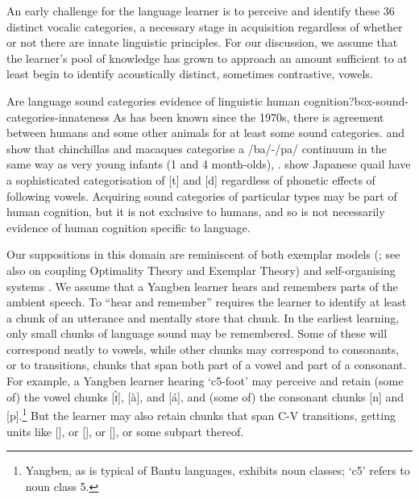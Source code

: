 An early challenge for the language learner is to perceive and identify these 36 distinct vocalic categories, a necessary  stage in acquisition regardless of whether or not there are innate linguistic principles. For our discussion, we assume that the learner's pool of knowledge has grown to approach an amount sufficient to at least begin to identify acoustically distinct, sometimes contrastive, vowels.

\begin{dadpbox}{Are language sound categories evidence of linguistic human cognition?}{box-sound-categories-innateness}
As has been known since the 1970s, there is agreement between humans and some other animals for at least some sound categories. \citet{Kuhl+:1975} and \citet{Kuhl+:1982macaques} show that chinchillas and macaques categorise a /ba/-/pa/ continuum in the same way as very young infants (1 and 4 month-olds), \citet{Eimas+:1971}. \citet{Kluender+_1987} show Japanese quail have a sophisticated categorisation of [t] and [d] regardless of phonetic effects of following vowels. Acquiring sound categories of particular types may be part of human cognition, but it is not exclusive to humans, and so is not necessarily evidence of human cognition specific to language. 
\end{dadpbox}

Our suppositions in this domain are reminiscent of both exemplar models (\citealt{Lacerda:1995, Lacerda:1998, Pierrehumbert:2001ed, Johnson:2007, Cole:2009}; see also \citealt{Weijer:2009, vandeWeijer:2012} on coupling Optimality Theory and Exemplar Theory) and self-organising systems  \citep{deBoer:2000selforg, Lin:2005, Wedel:2007}. We assume that a Yangben  learner hears and remembers parts of the ambient speech. To ``hear and remember'' requires the learner to identify at least a chunk of an utterance and mentally store that chunk. In the earliest learning, only small chunks of language sound may be remembered. Some of these will correspond neatly to vowels, while other chunks may correspond to consonants, or to transitions, chunks that span both part of a vowel and part of a consonant. For example, a Yangben  learner hearing \ipa{[n\`{ɪ}pàná]} `{\sc c5}-foot' may perceive and retain (some of) the vowel chunks [\`{ɪ}], [à], and [á], and (some of) the consonant chunks [n] and [p].\footnote{Yangben,  as is typical of Bantu languages, exhibits noun classes; `{\sc c5}' refers to noun class 5.} But the learner may also retain chunks that span C-V transitions, getting units like [], or [], or [], or some subpart thereof.

